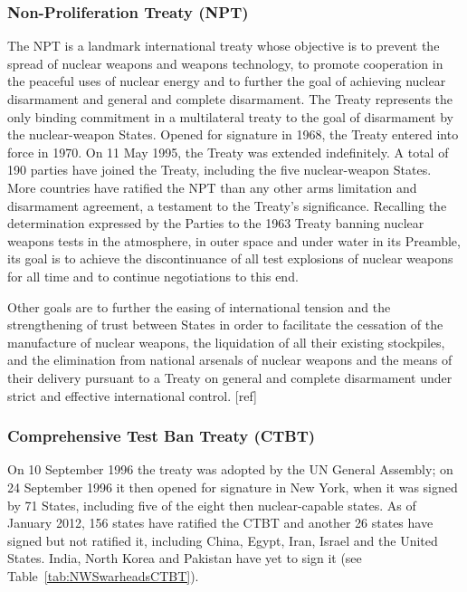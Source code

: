 \documentclass[twocolumn,a4paper]{article}
\begin{document}
\subsubsection{Non-Proliferation Treaty (NPT)}
The NPT is a landmark international treaty whose objective is to
prevent the spread of nuclear weapons and weapons technology, to
promote cooperation in the peaceful uses of nuclear energy and to
further the goal of achieving nuclear disarmament and general and
complete disarmament. The Treaty represents the only binding
commitment in a multilateral treaty to the goal of disarmament by the
nuclear-weapon States. Opened for signature in 1968, the Treaty
entered into force in 1970. On 11 May 1995, the Treaty was extended
indefinitely. A total of 190 parties have joined the Treaty, including
the five nuclear-weapon States. More countries have ratified the NPT
than any other arms limitation and disarmament agreement, a testament
to the Treaty's significance. Recalling the determination expressed by
the Parties to the 1963 Treaty banning nuclear weapons tests in the
atmosphere, in outer space and under water in its Preamble, its goal
is to achieve the discontinuance of all test explosions of nuclear
weapons for all time and to continue negotiations to this end.

Other goals are to further the easing of international tension and the
strengthening of trust between States in order to facilitate the
cessation of the manufacture of nuclear weapons, the liquidation of
all their existing stockpiles, and the elimination from national
arsenals of nuclear weapons and the means of their delivery pursuant
to a Treaty on general and complete disarmament under strict and
effective international control. [ref]

\subsubsection{Comprehensive Test Ban Treaty (CTBT)}
On 10 September 1996 the treaty was adopted by the UN General
Assembly; on 24 September 1996 it then opened for signature in New
York, when it was signed by 71 States, including five of the eight
then nuclear-capable states. As of January 2012, 156 states have
ratified the CTBT and another 26 states have signed but not ratified
it, including China, Egypt, Iran, Israel and the United States. India,
North Korea and Pakistan have yet to sign it (see Table~\ref{tab:NWSwarheadsCTBT}).
\end{document}
